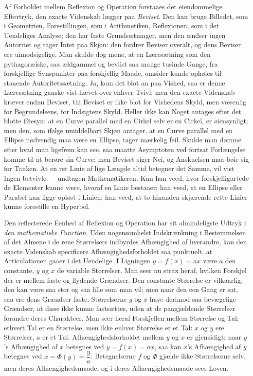 \documentclass[12pt]{book}
\newcommand{\apage}[1]{\marginnote{\footnotesize\textit{[#1]}}}
\begin{document}
Af Forholdet mellem Reflexion og Operation forstaaes det eiendommelige
Eftertryk, den exacte Videnskab lægger paa \emph{Beviset}. Den kan bruge Billedet,
som i Geometrien, Forestillingen, som i Arithmetiken, Reflexionen, som i
det Uendeliges Analyse; den har faste Grundsætninger, men den ændser ingen
Autoritet og tager Intet paa Skjøn: den fordrer Beviser overalt, og dens
Beviser ere uimodsigelige. Man skulde dog mene, at en Læresætning som den
pythagoræiske, saa ældgammel og beviist saa mange tusinde Gange, fra
forskjellige Synspunkter paa forskjellig Maade, omsider kunde ophøies til
staaende Autoritetssætning. Ja, kom det blot an paa Vished, saa er denne
Læresætning ganske vist hævet over enhver Tvivl; men den exacte Videnskab
kræver endnu Beviset, thi Beviset er ikke blot for Vishedens Skyld, men
væsenlig for Begrundelsens, for Indsigtens Skyld. Heller ikke kan Noget
antages efter det blotte Øiesyn: at en Curve parallel med en Cirkel selv
er en Cirkel, er øiensynligt; men den, som ifølge umiddelbart Skjøn
antager, at en Curve parallel med en Ellipse nødvendig maa være en \apage{120} Ellipse,
tager mærkelig feil. Skulde man dømme efter hvad man ligefrem kan see, saa
maatte Asymptoten ved fortsat Forlængelse komme til at berøre sin Curve;
men Beviset siger Nei, og Anskuelsen maa bøie sig for Tanken. At en ret
Linie af lige Længde altid betegner det Samme, vil vist Ingen betvivle ---
undtagen Mathematikeren. Kun han veed, hvor forskjelligartede de Elementer
kunne være, hvoraf en Linie bestaaer; han veed, at en Ellipse eller Parabel
kan ligge opløst i Linien; han veed, at to hinanden skjærende rette Linier
kunne forestille en Hyperbel.

Den reflecterede Eenhed af Reflexion og Operation har sit almindeligste
Udtryk i \emph{den mathematiske Function}. Uden nogensomhelst Indskrænkning i
Bestemmelsen af det Almene i de rene Størrelsers indbyrdes Afhængighed af
hverandre, kan den exacte Videnskab specificere Afhængighedsforholdet saa
punktuelt, at Articulationen gaaer i det Uendelige. I Ligningen $y = f(x) =
ax$ være $a$ den constante, $y$ og $x$ de variable Størrelser. Man seer nu
strax heraf, hvilken Forskjel der er mellem faste og flydende Grændser. Den
constante Størrelse er vilkaarlig, den kan være saa stor og saa lille som
man vil; men naar den een Gang er sat, saa ere dens Grændser faste.
Størrelserne $y$ og $x$ have derimod saa bevægelige Grændser, at disse ikke
kunne fastsættes, uden at de paagjældende Størrelser forandre deres
Charakteer. Man seer heraf Forskjellen mellem Størrelse og Tal; ethvert Tal
er en Størrelse, men ikke enhver Størrelse er et Tal: $x$ og $y$ ere
Størrelser, $a$ er et Tal. \apage{121} Afhængighedsforholdet mellem $y$ og $x$ er
gjensidigt; naar $y$'s Afhængighed af $x$ betegnes ved $y = f(x) = ax$, saa
kan $x$'s Afhængighed af $y$ betegnes ved $x = \Phi(y) = \dfrac{y}{a}$.
Betegnelserne $f$ og $\Phi$ gjælde ikke Størrelserne selv, men deres
Afhængighedsmaade, og i deres Afhængighedsmaade sees Loven.
\end{document}
